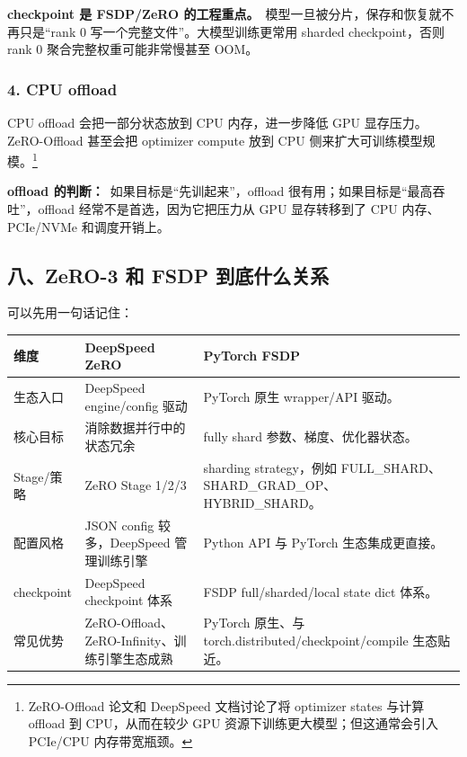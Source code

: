 \begin{warnbox}
\textbf{checkpoint 是 FSDP/ZeRO 的工程重点。}\
模型一旦被分片，保存和恢复就不再只是“rank 0 写一个完整文件”。大模型训练更常用 sharded checkpoint，否则 rank 0 聚合完整权重可能非常慢甚至 OOM。
\end{warnbox}

\subsubsection*{4. CPU offload}

CPU offload 会把一部分状态放到 CPU 内存，进一步降低 GPU 显存压力。ZeRO-Offload 甚至会把 optimizer compute 放到 CPU 侧来扩大可训练模型规模。\footnote{ZeRO-Offload 论文和 DeepSpeed 文档讨论了将 optimizer states 与计算 offload 到 CPU，从而在较少 GPU 资源下训练更大模型；但这通常会引入 PCIe/CPU 内存带宽瓶颈。}

\begin{summarybox}
\textbf{offload 的判断：}\
如果目标是“先训起来”，offload 很有用；如果目标是“最高吞吐”，offload 经常不是首选，因为它把压力从 GPU 显存转移到了 CPU 内存、PCIe/NVMe 和调度开销上。
\end{summarybox}

\subsection{八、ZeRO-3 和 FSDP 到底什么关系}

可以先用一句话记住：

\begin{center}
{\small
\begin{tabular}{p{3.2cm}p{4.6cm}p{4.8cm}}
\hline
\textbf{维度} & \textbf{DeepSpeed ZeRO} & \textbf{PyTorch FSDP} \\
\hline
生态入口 & DeepSpeed engine/config 驱动 & PyTorch 原生 wrapper/API 驱动。 \\
核心目标 & 消除数据并行中的状态冗余 & fully shard 参数、梯度、优化器状态。 \\
Stage/策略 & ZeRO Stage 1/2/3 & sharding strategy，例如 FULL\_SHARD、SHARD\_GRAD\_OP、HYBRID\_SHARD。 \\
配置风格 & JSON config 较多，DeepSpeed 管理训练引擎 & Python API 与 PyTorch 生态集成更直接。 \\
checkpoint & DeepSpeed checkpoint 体系 & FSDP full/sharded/local state dict 体系。 \\
常见优势 & ZeRO-Offload、ZeRO-Infinity、训练引擎生态成熟 & PyTorch 原生、与 torch.distributed/checkpoint/compile 生态贴近。 \\
\hline
\end{tabular}
}
\end{center}


